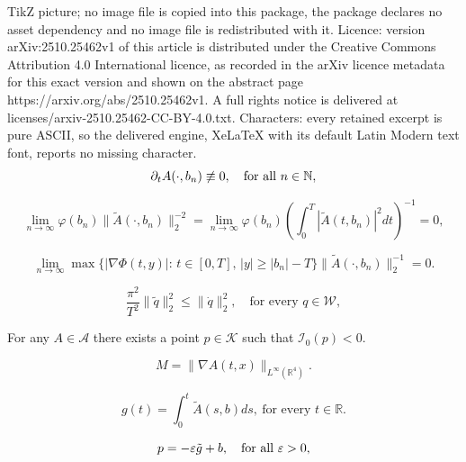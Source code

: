 \documentclass[10pt,a4paper]{amsart}
\newcommand{\R}{\mathbb{R}}
\newcommand{\boA}{\mathcal{A}}
\newcommand{\boI}{\mathcal{I}}
\newcommand{\boK}{\mathcal{K}}
\newcommand{\boW}{\mathcal{W}}
\newcommand{\dq}{\dot{q}}
\begin{document}
TikZ picture; no image file is copied into this package, the package declares no asset dependency and no image file is redistributed with it. Licence: version arXiv:2510.25462v1 of this article is distributed under the Creative Commons Attribution 4.0 International licence, as recorded in the arXiv licence metadata for this exact version and shown on the abstract page https://arxiv.org/abs/2510.25462v1. A full rights notice is delivered at licenses/arxiv-2510.25462-CC-BY-4.0.txt. Characters: every retained excerpt is pure ASCII, so the delivered engine, XeLaTeX with its default Latin Modern text font, reports no missing character.
\begin{equation}\label{cond:varphi0}
    \partial_t A(\cdot,b_n)\not\equiv 0,\quad\hbox{for all }n\in\mathbb{N},
\end{equation}

\begin{equation}\label{cond:varphi1}
	    \lim\limits_{n\to\infty}\varphi(b_n)\|\tilde A(\cdot,b_n)\|^{-2}_2=\lim\limits_{n\to\infty}\varphi(b_n)\left(\int_0^T\left|\tilde A(t,b_n)\right|^2dt\right)^{-1}=0,
\end{equation}

\begin{equation}\label{cond:varphi2}
	\lim_{n\to\infty}\max\{|\nabla\Phi(t,y)|:\,t\in[0,T],\,|y|\geq |b_n|-T\}\|\tilde A(\cdot,b_n)\|^{-1}_2=0.
\end{equation}

\begin{equation}\label{eq:poincare}
	\frac{\pi^2}{T^2}\|\tilde q\|^2_2\leq\|\dq\|^2_2,\quad\text{for every }q\in\boW,
\end{equation}

\begin{lemma}\label{lemma:negative}
For any $A\in\boA$ there exists a point $p\in\boK$ such that $\boI_0(p)<0$.
\end{lemma}

\begin{equation}\label{def:Jac}
	M=\|\nabla A(t,x)\|_{L^\infty(\R^4)}.
\end{equation}

\begin{equation}\label{def:g(t)}
	g(t)=\int_0^t \tilde A(s,b) ds,\ \text{for every }t\in\R.
\end{equation}

\begin{equation}\label{def:p-eps}
  p=-\varepsilon \tilde g + b,\quad\hbox{for all }\varepsilon>0,
\end{equation}
\end{document}
